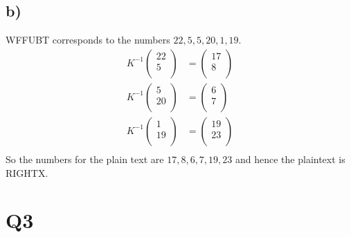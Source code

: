 \documentclass{article}
\begin{document}
\subsection*{b)}
WFFUBT corresponds to the numbers $22,5,5,20,1,19$.
\begin{align*}
K^{-1}\begin{pmatrix}22\\5\\\end{pmatrix}&=\begin{pmatrix}17\\8\\\end{pmatrix}\\
K^{-1}\begin{pmatrix}5\\20\\\end{pmatrix}&=\begin{pmatrix}6\\7\\\end{pmatrix}\\
K^{-1}\begin{pmatrix}1\\19\\\end{pmatrix}&=\begin{pmatrix}19\\23\\\end{pmatrix}\\
\end{align*}
So the numbers for the plain text are $17,8,6,7,19,23$ and hence the plaintext is RIGHTX.
\section*{Q3}
\end{document}
